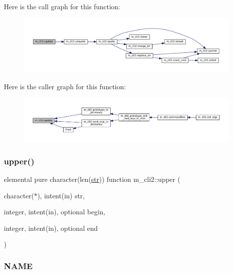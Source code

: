 Here is the call graph for this function\+:\nopagebreak
\begin{figure}[H]
\begin{center}
\leavevmode
\includegraphics[width=350pt]{namespacem__cli2_a160d56bc4a10faef7e8a8a4f04f4dadb_cgraph}
\end{center}
\end{figure}
Here is the caller graph for this function\+:\nopagebreak
\begin{figure}[H]
\begin{center}
\leavevmode
\includegraphics[width=350pt]{namespacem__cli2_a160d56bc4a10faef7e8a8a4f04f4dadb_icgraph}
\end{center}
\end{figure}
\mbox{\label{namespacem__cli2_afa7a2419002024ff6d950c5d905ddd7a}} 
\subsubsection{\texorpdfstring{upper()}{upper()}}
{\footnotesize\ttfamily elemental pure character(len(\mbox{\hyperlink{interfacem__cli2_1_1str}{str}})) function m\+\_\+cli2\+::upper (\begin{DoxyParamCaption}\item[{character($\ast$), intent(in)}]{str,  }\item[{integer, intent(in), optional}]{begin,  }\item[{integer, intent(in), optional}]{end }\end{DoxyParamCaption})\hspace{0.3cm}{\ttfamily [private]}}



\subsubsection*{N\+A\+ME}

